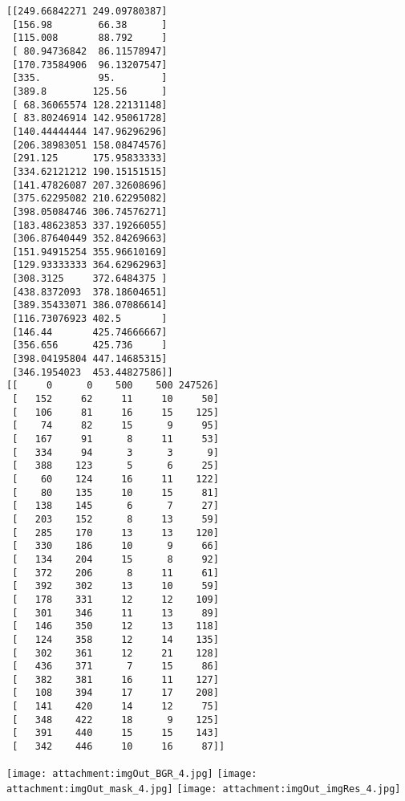 \documentclass[11pt]{article}
\makeatletter
\def\maxwidth{\ifdim\Gin@nat@width>\linewidth\linewidth
    \else\Gin@nat@width\fi}
\let\Oldincludegraphics\includegraphics
\renewcommand{\includegraphics}[1]{\Oldincludegraphics[width=.8\maxwidth]{#1}}
\makeatother
\begin{document}
    \begin{Verbatim}[commandchars=\\\{\}]
[[249.66842271 249.09780387]
 [156.98        66.38      ]
 [115.008       88.792     ]
 [ 80.94736842  86.11578947]
 [170.73584906  96.13207547]
 [335.          95.        ]
 [389.8        125.56      ]
 [ 68.36065574 128.22131148]
 [ 83.80246914 142.95061728]
 [140.44444444 147.96296296]
 [206.38983051 158.08474576]
 [291.125      175.95833333]
 [334.62121212 190.15151515]
 [141.47826087 207.32608696]
 [375.62295082 210.62295082]
 [398.05084746 306.74576271]
 [183.48623853 337.19266055]
 [306.87640449 352.84269663]
 [151.94915254 355.96610169]
 [129.93333333 364.62962963]
 [308.3125     372.6484375 ]
 [438.8372093  378.18604651]
 [389.35433071 386.07086614]
 [116.73076923 402.5       ]
 [146.44       425.74666667]
 [356.656      425.736     ]
 [398.04195804 447.14685315]
 [346.1954023  453.44827586]]
[[     0      0    500    500 247526]
 [   152     62     11     10     50]
 [   106     81     16     15    125]
 [    74     82     15      9     95]
 [   167     91      8     11     53]
 [   334     94      3      3      9]
 [   388    123      5      6     25]
 [    60    124     16     11    122]
 [    80    135     10     15     81]
 [   138    145      6      7     27]
 [   203    152      8     13     59]
 [   285    170     13     13    120]
 [   330    186     10      9     66]
 [   134    204     15      8     92]
 [   372    206      8     11     61]
 [   392    302     13     10     59]
 [   178    331     12     12    109]
 [   301    346     11     13     89]
 [   146    350     12     13    118]
 [   124    358     12     14    135]
 [   302    361     12     21    128]
 [   436    371      7     15     86]
 [   382    381     16     11    127]
 [   108    394     17     17    208]
 [   141    420     14     12     75]
 [   348    422     18      9    125]
 [   391    440     15     15    143]
 [   342    446     10     16     87]]

    \end{Verbatim}

    \texttt{[image: attachment:imgOut\_BGR\_4.jpg]}
\texttt{[image: attachment:imgOut\_mask\_4.jpg]}
\texttt{[image: attachment:imgOut\_imgRes\_4.jpg]}


    
    
    
    
\end{document}
